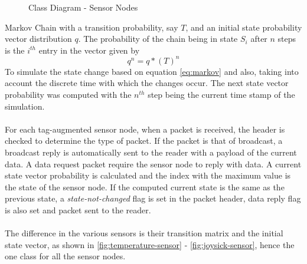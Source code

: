 \begin{centering}
\begin{figure}[h!]
    \caption{Class Diagram - Sensor Nodes}
    \label{fig:SensorNodes}
\end{figure}
\end{centering}
Markov Chain with a transition probability, say \textbf{$T$}, and an initial state
probability vector distribution \textbf{$q$}. The probability of the chain being in
state $S_i$ after $n$ steps is the $i^{th}$ entry in the vector given by
\begin{equation}
    q^n = q*( T)^n
    \label{eq:markov}
\end{equation}
To simulate the state change based on equation \ref{eq:markov} and also, taking into
account the discrete time with which the changes occur. The next state vector
probability was computed with the $n^{th}$ step being the current time stamp of the
simulation.\\\\
For each tag-augmented sensor node, when a packet is received, the header is checked
to determine the type of packet. If the packet is that of broadcast, a broadcast
reply is automatically sent to the reader with a payload of the current data.
A data request packet require the sensor node to reply with data. A current state
vector probability is calculated and the index with the maximum value is the state 
of the sensor node. If the computed current state is the same as the previous state,
a \textit{state-not-changed} flag is set in the packet header, data reply flag is 
also set and packet sent to the reader.\\\\
The difference in the various sensors is their transition matrix and the initial
state vector, as shown in \ref{fig:temperature-sensor} - \ref{fig:joysick-sensor},
hence the one class for all the sensor nodes.\\\\
